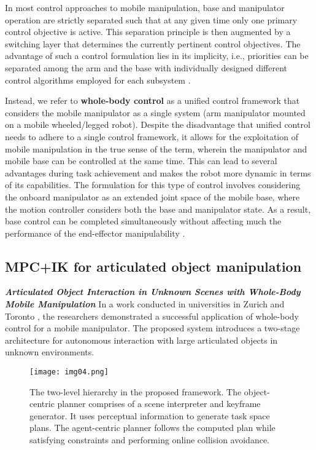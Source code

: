 In most control approaches to mobile manipulation, base and manipulator operation are strictly
separated such that at any given time only one primary control objective is
active. This separation principle is then augmented by a switching layer that determines the
currently pertinent control objectives. The advantage of such a control formulation lies in its
implicity, i.e., priorities can be separated among the arm and the base with individually
designed different control algorithms employed for each subsystem \cite{thakar2023survey}.

Instead, we refer to \textbf{whole-body control} as a unified control framework that considers
the mobile manipulator as a single system (arm manipulator mounted on a mobile wheeled/legged robot).
Despite the disadvantage that unified control needs to adhere to a single control framework,
it allows for the exploitation of mobile manipulation in the true sense of the term,
wherein the manipulator and mobile base can be controlled at the same time. This can lead
to several advantages during task achievement and makes the robot more dynamic in terms
of its capabilities. The formulation for this type of control involves considering
the onboard manipulator as an extended joint space of the mobile base, where the motion controller
considers both the base and manipulator state. As a result, base control can be completed
simultaneously without affecting much the performance of the end-effector manipulability
\cite{thakar2023survey}.

\subsection{MPC+IK for articulated object manipulation}

\textbf{\textit{Articulated Object Interaction in Unknown Scenes
		with Whole-Body Mobile Manipulation}} \quad
In a work conducted in universities in Zurich and Toronto \cite{mittal2022articulated},
the researchers demonstrated a successful application of whole-body control for a mobile
manipulator. The proposed system introduces a two-stage architecture for autonomous interaction
with large articulated objects in unknown environments.

\begin{figure}[H]
	\centering
	\texttt{[image: img04.png]}
	\captionsetup{width=0.9\linewidth}
	\caption{ The two-level hierarchy in the proposed framework. The
		object-centric planner comprises of a scene interpreter and keyframe
		generator. It uses perceptual information to generate task space
		plans. The agent-centric planner follows the computed plan while
		satisfying constraints and performing online collision avoidance.
		\cite{mittal2022articulated}}
	\label{fig:img04}
\end{figure}



